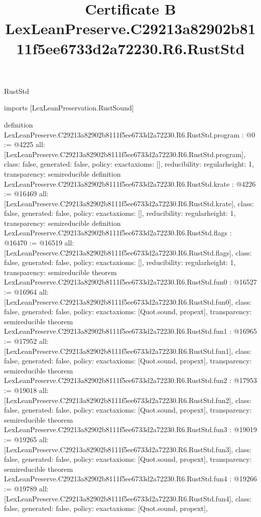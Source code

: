 \begin{lexlean}{RustStd}
\title{Certificate B LexLeanPreserve.C29213a82902b8111f5ee6733d2a72230.R6.RustStd}
\begin{coremodule}
imports [LexLeanPreservation.RustSound]

definition LexLeanPreserve.C29213a82902b8111f5ee6733d2a72230.R6.RustStd.program : @0 := @4225 {
  all: [LexLeanPreserve.C29213a82902b8111f5ee6733d2a72230.R6.RustStd.program],
  class: false,
  generated: false,
  policy: exact{axioms: []},
  reducibility: regular{height: 1},
  transparency: semireducible
}
definition LexLeanPreserve.C29213a82902b8111f5ee6733d2a72230.R6.RustStd.krate : @4226 := @16469 {
  all: [LexLeanPreserve.C29213a82902b8111f5ee6733d2a72230.R6.RustStd.krate],
  class: false,
  generated: false,
  policy: exact{axioms: []},
  reducibility: regular{height: 1},
  transparency: semireducible
}
definition LexLeanPreserve.C29213a82902b8111f5ee6733d2a72230.R6.RustStd.flags : @16470 := @16519 {
  all: [LexLeanPreserve.C29213a82902b8111f5ee6733d2a72230.R6.RustStd.flags],
  class: false,
  generated: false,
  policy: exact{axioms: []},
  reducibility: regular{height: 1},
  transparency: semireducible
}
theorem LexLeanPreserve.C29213a82902b8111f5ee6733d2a72230.R6.RustStd.fun0 : @16527 := @16964 {
  all: [LexLeanPreserve.C29213a82902b8111f5ee6733d2a72230.R6.RustStd.fun0],
  class: false,
  generated: false,
  policy: exact{axioms: [Quot.sound, propext]},
  transparency: semireducible
}
theorem LexLeanPreserve.C29213a82902b8111f5ee6733d2a72230.R6.RustStd.fun1 : @16965 := @17952 {
  all: [LexLeanPreserve.C29213a82902b8111f5ee6733d2a72230.R6.RustStd.fun1],
  class: false,
  generated: false,
  policy: exact{axioms: [Quot.sound, propext]},
  transparency: semireducible
}
theorem LexLeanPreserve.C29213a82902b8111f5ee6733d2a72230.R6.RustStd.fun2 : @17953 := @19018 {
  all: [LexLeanPreserve.C29213a82902b8111f5ee6733d2a72230.R6.RustStd.fun2],
  class: false,
  generated: false,
  policy: exact{axioms: [Quot.sound, propext]},
  transparency: semireducible
}
theorem LexLeanPreserve.C29213a82902b8111f5ee6733d2a72230.R6.RustStd.fun3 : @19019 := @19265 {
  all: [LexLeanPreserve.C29213a82902b8111f5ee6733d2a72230.R6.RustStd.fun3],
  class: false,
  generated: false,
  policy: exact{axioms: [Quot.sound, propext]},
  transparency: semireducible
}
theorem LexLeanPreserve.C29213a82902b8111f5ee6733d2a72230.R6.RustStd.fun4 : @19266 := @19789 {
  all: [LexLeanPreserve.C29213a82902b8111f5ee6733d2a72230.R6.RustStd.fun4],
  class: false,
  generated: false,
  policy: exact{axioms: [Quot.sound, propext]},
}
\end{coremodule}
\end{lexlean}
